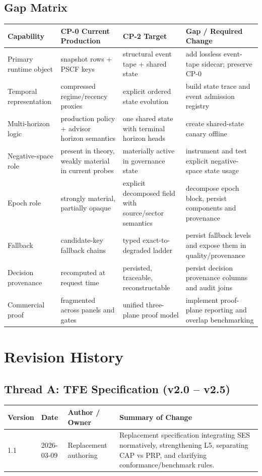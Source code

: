 \documentclass[11pt]{report}
\begin{document}
\section{Gap Matrix}
\begin{longtable}{p{}p{}p{}p{}}
\toprule
Capability & CP-0 Current Production & CP-2 Target & Gap / Required Change \\
\midrule
Primary runtime object & snapshot rows + PSCF keys & structural event tape + shared state & add lossless event-tape sidecar; preserve CP-0 \\
Temporal representation & compressed regime/recency proxies & explicit ordered state evolution & build state trace and event admission registry \\
Multi-horizon logic & production policy + advisor horizon semantics & one shared state with terminal horizon heads & create shared-state canary offline \\
Negative-space role & present in theory, weakly material in current probes & materially active in governance state & instrument and test explicit negative-space state usage \\
Epoch role & strongly material, partially opaque & explicit decomposed field with source/sector semantics & decompose epoch block, persist components and provenance \\
Fallback & candidate-key fallback chains & typed exact-to-degraded ladder & persist fallback levels and expose them in quality/provenance \\
Decision provenance & recomputed at request time & persisted, traceable, reconstructable & persist decision provenance columns and audit joins \\
Commercial proof & fragmented across panels and gates & unified three-plane proof model & implement proof-plane reporting and overlap benchmarking \\
\bottomrule
\end{longtable}
\chapter{Revision History}

\section*{Thread A: TFE Specification (v2.0 -- v2.5)}
\begin{longtable}{p{}p{}p{}p{}}
\toprule
Version & Date & Author / Owner & Summary of Change \\
\midrule
1.1 & 2026-03-09 & Replacement authoring & Replacement specification integrating SES normatively, strengthening L5, separating CAP vs PRP, and clarifying conformance/benchmark rules. \\
\bottomrule
\end{longtable}
\end{document}
